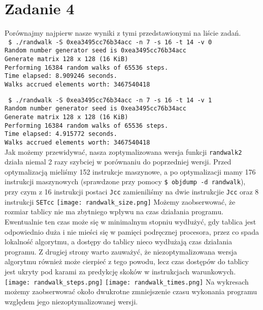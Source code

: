 \documentclass[10pt,wide]{mwart}
\begin{document}
 \section{Zadanie 4}
 Porównajmy najpierw nasze wyniki z tymi przedstawionymi na liście zadań. \\
 \texttt{
        \$ ./randwalk -S 0xea3495cc76b34acc -n 7 -s 16 -t 14 -v 0 \\
        Random number generator seed is 0xea3495cc76b34acc \\
        Generate matrix 128 x 128 (16 KiB) \\
        Performing 16384 random walks of 65536 steps. \\
        Time elapsed: 8.909246 seconds. \\
        Walks accrued elements worth: 3467540418 \\}

\texttt{
        \$ ./randwalk -S 0xea3495cc76b34acc -n 7 -s 16 -t 14 -v 1 \\
        Random number generator seed is 0xea3495cc76b34acc \\
        Generate matrix 128 x 128 (16 KiB) \\
        Performing 16384 random walks of 65536 steps. \\
        Time elapsed: 4.915772 seconds. \\
        Walks accrued elements worth: 3467540418 \\
}
Jak możemy przewidywać, nasza zoptymalizowana wersja funkcji \texttt{randwalk2} działa niemal 2 razy szybciej w porównaniu do poprzedniej wersji.
 Przed optymalizacją mieliśmy 152 instrukcje maszynowe, a po optymalizacji mamy 176 instrukcji maszynowych (sprawdzone przy pomocy \texttt{\$ objdump -d randwalk}),
 przy czym z 16 instrukcji postaci \texttt{Jcc} zamieniliśmy na dwie instrukcjie \texttt{Jcc} oraz 8 instrukcji \texttt{SETcc}
 \texttt{[image: randwalk\_size.png]}
 Możemy zaobserwować, że rozmiar tablicy nie ma zbytniego wpływu na czas działania programu.
 Ewentualnie ten czas może się w minimalnym stopniu wydłużyć,
 gdy tablica jest odpowiednio duża i nie mieści się w pamięci podręcznej procesora,
 przez co spada lokalność algorytmu, a dostępy do tablicy nieco wydłużają czas działania programu.
 Z drugiej strony warto zauważyć, że niezoptymalizowana wersja algorytmu również może cierpieć z tego powodu,
 lecz czas dostępów do tablicy jest ukryty pod karami za predykcję skoków w instrukcjach warunkowych.
 \texttt{[image: randwalk\_steps.png]}
 \texttt{[image: randwalk\_times.png]}
 Na wykresach możemy zaobserwować około dwukrotne zmniejszenie czasu wykonania programu względem jego niezoptymalizowanej wersji.
\end{document}
